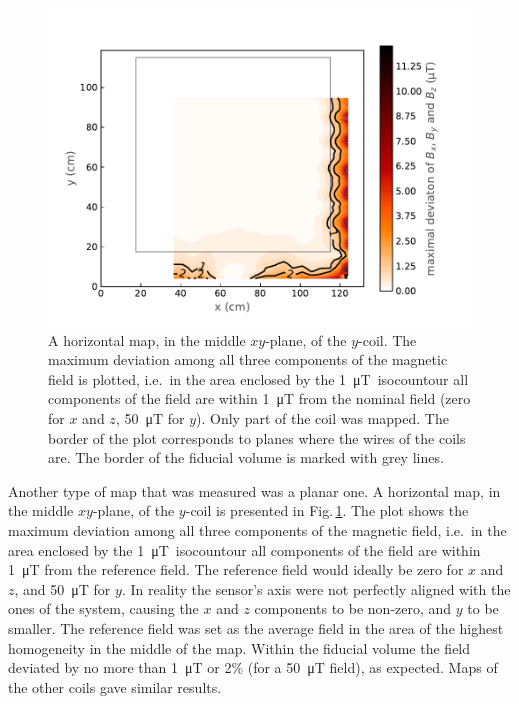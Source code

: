\begin{figure}
  \centering
  \includegraphics[width=0.8\linewidth]{gfx/prototype/planar_map_Y_max_deviation.pdf}
  \caption{A horizontal map, in the middle $xy$-plane, of the $y$-coil. The maximum deviation among all three components of the magnetic field is plotted, i.e.\ in the area enclosed by the \SI{1}{\micro\tesla}~isocountour all components of the field are within \SI{1}{\micro\tesla} from the nominal field (zero for $x$ and $z$, \SI{50}{\micro\tesla} for $y$). Only part of the coil was mapped. The border of the plot corresponds to planes where the wires of the coils are. The border of the fiducial volume is marked with grey lines.}
  \label{fig:prototype_plane_map}
\end{figure}

Another type of map that was measured was a planar one. A horizontal map, in the middle $xy$-plane, of the $y$-coil is presented in Fig.\,\ref{fig:prototype_plane_map}. The plot shows the maximum deviation among all three components of the magnetic field, i.e.\ in the area enclosed by the \SI{1}{\micro\tesla}~isocountour all components of the field are within \SI{1}{\micro\tesla} from the reference field. The reference field would ideally be zero for $x$ and $z$, and \SI{50}{\micro\tesla} for $y$. In reality the sensor's axis were not perfectly aligned with the ones of the system, causing the $x$ and $z$ components to be non-zero, and $y$ to be smaller. The reference field was set as the average field in the area of the highest homogeneity in the middle of the map. Within the fiducial volume the field deviated by no more than \SI{1}{\micro\tesla} or 2\% (for a \SI{50}{\micro\tesla} field), as expected. Maps of the other coils gave similar results.




